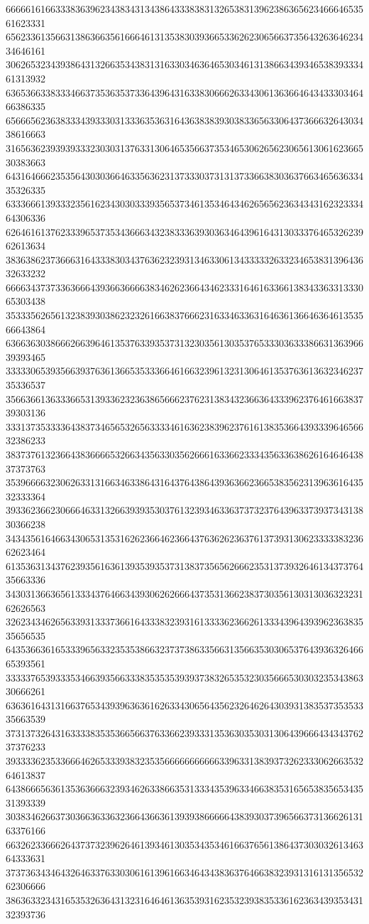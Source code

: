 66666161663338363962343834313438643338383132653831396238636562346664653561623331
65623361356631386366356166646131353830393665336262306566373564326364623434646161
30626532343938643132663534383131633034636465303461313866343934653839333461313932
63653663383334663735363537336439643163383066626334306136366464343330346466386335
65666562363833343933303133363536316436383839303833656330643736663264303438616663
31656362393939333230303137633130646535663735346530626562306561306162366530383663
64316466623535643030366463356362313733303731313733663830363766346563633435326335
63336661393332356162343030333935653734613534643462656562363434316232333464306336
62646161376233396537353436663432383336393036346439616431303337646532623962613634
38363862373666316433383034376362323931346330613433333263323465383139643632633232
66663437373363666439366366663834626236643462333164616336613834336331333065303438
35333562656132383930386232326166383766623163346336316463613664636461353566643864
63663630386662663964613537633935373132303561303537653330363338663136396639393465
33333065393566393763613665353336646166323961323130646135376361363234623735336537
35663661363336653139336232363865666237623138343236636433396237646166383739303136
33313735333364383734656532656333346163623839623761613835366439333964656632386233
38373761323664383666653266343563303562666163366233343563363862616464643837373763
35396666323062633131663463386431643764386439363662366538356231396361643532333364
39336236623066646331326639393530376132393463363737323764396337393734313830366238
34343561646634306531353162623664623664376362623637613739313062333338323662623464
61353631343762393561636139353935373138373565626662353137393264613437376435663336
34303136636561333437646634393062626664373531366238373035613031303632323162626563
32623434626563393133373661643338323931613333623662613334396439396236383535656535
64353663616533396563323535386632373738633566313566353030653764393632646665393561
33333765393335346639356633383535353939373832653532303566653030323534386330666261
63636164313166376534393963636162633430656435623264626430393138353735353335663539
37313732643163333835353665663763366239333135363035303130643966643434376237376233
39333362353366646265333938323535666666666663396331383937326233306266353264613837
64386665636135363666323934626338663531333435396334663835316565383565343531393339
30383462663730366363363236643663613939386666643839303739656637313662613163376166
66326233666264373732396264613934613035343534616637656138643730303261346364333631
37373634346432646337633030616139616634643438363764663832393131613135653262306666
38636332343165353263643132316464613635393162353239383533616236343935343132393736
